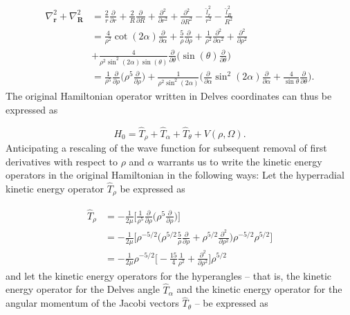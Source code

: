 \documentclass{article}
\numberwithin{equation}{section}
\numberwithin{figure}{section}
\begin{document}
\begin{align}
\nabla^2_{\mathbf{r}} + \nabla^2_{\mathbf{R}} &= \frac{2}{r}\frac{\partial}{\partial r} +  \frac{2}{R} \frac{\partial}{\partial R}  +\frac{\partial^2}{\partial r^{2}} + \frac{\partial^2}{\partial R^{2}} - \frac{\hat{l}^{2}_{r}}{r^2} - \frac{\hat{l}^{2}_{R}}{R^2} \nonumber \\
&= \frac{4}{\rho^2} \cot(2\alpha) \frac{\partial}{\partial\alpha} + \frac{5}{\rho} \frac{\partial}{\partial\rho} + \frac{1}{\rho^2} \frac{\partial^2}{\partial\alpha^2} + \frac{\partial^2}{\partial\rho^2} \nonumber \\
&+ \frac{4}{\rho^2 \sin^2(2\alpha)\sin(\theta)} \frac{\partial}{\partial\theta} \bigg( \sin(\theta) \frac{\partial}{\partial{\theta}} \bigg) \nonumber \\
&= \frac{1}{\rho^5}\frac{\partial}{\partial\rho} \bigg( \rho^5 \frac{\partial}{\partial\rho} \bigg) + \frac{1}{\rho^2 \sin^2(2\alpha)}  \bigg( \frac{\partial}{\partial\alpha} \sin^2(2\alpha) \frac{\partial}{\partial\alpha} + \frac{4}{\sin\theta} \frac{\partial}{\partial\theta} \bigg).
\end{align}
The original Hamiltonian operator written in Delves coordinates can thus be expressed as 

\begin{equation}
H_0 = \hat{T}_{\rho} + \hat{T}_{\alpha} + \hat{T}_{\theta} + V(\rho,\Omega).
\end{equation}  
Anticipating a rescaling of the wave function for subsequent removal of first derivatives with respect to $\rho$ and $\alpha$ warrants us to write the kinetic energy operators in the original Hamiltonian in the following ways: Let the hyperradial kinetic energy operator $\hat{T}_{\rho}$ be expressed as

\begin{align}
\hat{T}_{\rho} &= -\frac{1}{2\mu} \Big[ \frac{1}{\rho^5}\frac{\partial}{\partial\rho} \Big( \rho^5 \frac{\partial}{\partial\rho} \Big)  \Big] \nonumber\\ 
&= -\frac{1}{2\mu} \Big[ \rho^{-5/2} \Big( \rho^{5/2} \frac{5}{\rho} \frac{\partial}{\partial\rho} + \rho^{5/2} \frac{\partial^2}{\partial\rho^2} \Big) \rho^{-5/2} \rho^{5/2} \Big]\nonumber\\
&= -\frac{1}{2\mu} \rho^{-5/2} \Big[  -\frac{15}{4} \frac{1}{\rho^2} + \frac{\partial^2}{\partial\rho^2} \Big] \rho^{5/2}
\end{align}
and let the kinetic energy operators for the hyperangles -- that is, the kinetic energy operator for the Delves angle $\hat{T}_{\alpha}$ and the kinetic energy operator for the angular momentum of the Jacobi vectors $\hat{T}_{\theta}$ -- be expressed as 
\end{document}
